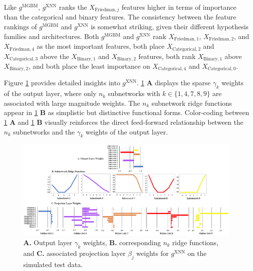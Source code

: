 \documentclass[information,article,submit,moreauthors,pdftex]{definitions/mdpi}
\begin{document}
\noindent Like $g^\text{MGBM}$, $g^\text{XNN}$ ranks the $X_{\text{Friedman},j}$ features higher in terms of importance than the categorical and binary features. The consistency between the feature rankings of $g^\text{MGBM}$ and $g^\text{XNN}$ is somewhat striking, given their different hypothesis families and architectures. Both $g^\text{MGBM}$ and $g^\text{XNN}$ rank $X_{\text{Friedman},1}$, $X_{\text{Friedman},2}$, and $X_{\text{Friedman},4}$ as the most important features, both place $X_{\text{Categorical},2}$ and $X_{\text{Categorical},3}$ above the $X_{\text{Binary},1}$ and $X_{\text{Binary},2}$ features, both rank $X_{\text{Binary},1}$ above $X_{\text{Binary},2}$, and both place the least importance on $X_{\text{Categorical},4}$ and $X_{\text{Categorical},0}$. 

Figure \ref{fig:sim_xnn_glob_ridge} provides detailed insights into $g^\text{XNN}$. \ref{fig:sim_xnn_glob_ridge} \textbf{A} displays the sparse $\gamma_k$ weights of the output layer, where only $n_k$ subnetworks with $k \in \{1, 4, 7, 8, 9\}$ are associated with large magnitude weights. The $n_k$ subnetwork ridge functions appear in \ref{fig:sim_xnn_glob_ridge} \textbf{B} as simplistic but distinctive functional forms. Color-coding between \ref{fig:sim_xnn_glob_ridge} \textbf{A} and \ref{fig:sim_xnn_glob_ridge} \textbf{B} visually reinforces the direct feed-forward relationship between the $n_k$ subnetworks and the $\gamma_k$ weights of the output layer.

\begin{figure}[H]
\centering
\includegraphics[width=17cm]{img/sim_xnn_glob_ridge.png}
\caption{\textbf{A.} Output layer $\gamma_k$ weights, \textbf{B.} corresponding $n_k$ ridge functions, and \textbf{C.} associated projection layer $\beta_j$ weights for $g^\text{XNN}$ on the simulated test data.}
\label{fig:sim_xnn_glob_ridge}
\end{figure}   
\end{document}
